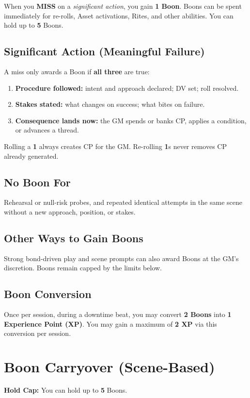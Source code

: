 When you \textbf{MISS} on a \emph{significant action}, you gain \textbf{1 Boon}. Boons can be spent immediately for re-rolls, Asset activations, Rites, and other abilities. You can hold up to \textbf{5} Boons.

\subsection*{Significant Action (Meaningful Failure)}
A miss only awards a Boon if \textbf{all three} are true:
\begin{enumerate}
  \item \textbf{Procedure followed:} intent and approach declared; DV set; roll resolved.
  \item \textbf{Stakes stated:} what changes on success; what bites on failure.
  \item \textbf{Consequence lands now:} the GM spends or banks CP, applies a condition, or advances a thread.
\end{enumerate}
\noindent Rolling a \textbf{1} always creates CP for the GM. Re-rolling \textbf{1}s never removes CP already generated.

\subsection*{No Boon For}
Rehearsal or null-risk probes, and repeated identical attempts in the same scene without a new approach, position, or stakes.

\subsection*{Other Ways to Gain Boons}
Strong bond-driven play and scene prompts can also award Boons at the GM's discretion. Boons remain capped by the limits below.

\subsection*{Boon Conversion}
Once per session, during a downtime beat, you may convert \textbf{2 Boons} into \textbf{1 Experience Point (XP)}. You may gain a maximum of \textbf{2 XP} via this conversion per session.

\section{Boon Carryover (Scene-Based)}
\textbf{Hold Cap:} You can hold up to \textbf{5} Boons.

